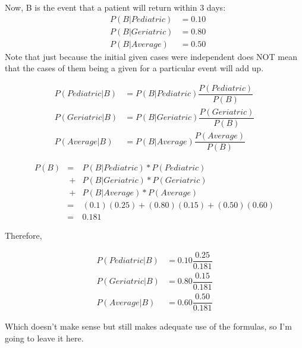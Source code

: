 \documentclass[]{article}
\begin{document}
		Now, B is the event that a patient will return within 3 days:
		\begin{align*}
			&P(B|Pediatric) &= 0.10\\
			&P(B|Geriatric) &= 0.80\\
			&P(B|Average)   &= 0.50
		\end{align*}
		Note that just because the initial given cases were independent does NOT mean that the cases of them being a given for a particular event will add up.
		
		\begin{align*}
			P(Pediatric|B) &= P(B|Pediatric)\dfrac{P(Pediatric)}{P(B)}\\
			P(Geriatric|B) &= P(B|Geriatric)\dfrac{P(Geriatric)}{P(B)}\\
			  P(Average|B) &= P(B|Average)\dfrac{P(Average)}{P(B)}
		\end{align*}
		
		\begin{align*}
			P(B) &=\ & P(B|Pediatric) * P(Pediatric)\\
			     &\ +& P(B|Geriatric) * P(Geriatric)\\
			     &\ +& P(B|Average) * P(Average)\\
			     &=\ & (0.1)(0.25) + (0.80)(0.15) + (0.50)(0.60)\\
			     &=\ & 0.181
		\end{align*}
		
		Therefore,
		
		\begin{align*}
			P(Pediatric|B) &= 0.10\dfrac{0.25}{0.181} \\
			P(Geriatric|B) &= 0.80\dfrac{0.15}{0.181} \\
			P(Average|B)   &= 0.60\dfrac{0.50}{0.181}
		\end{align*}
		
		Which doesn't make sense but still makes adequate use of the formulas, so I'm going to leave it here.
	
\end{document}
